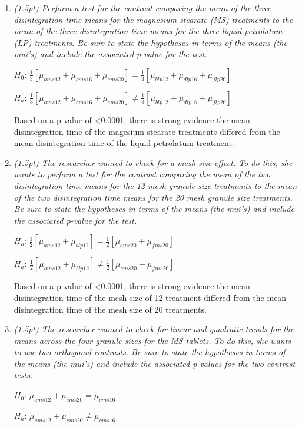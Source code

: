 \documentclass{article}\usepackage[]{graphicx}\usepackage[]{color}
\begin{document}
\begin{enumerate}
\begin{enumerate}
\item
{\it  (1.5pt) Perform a test for the contrast comparing the mean of the three disintegration time
means for the magnesium stearate (MS) treatments to the mean of the three disintegration time
means for the three liquid petrolatum (LP) treatments. Be sure to state the hypotheses in terms
of the means (the mui's) and include the associated p-value for the test.}

$H_{0}$: $\frac{1}{3}[\mu_{ams12} + \mu_{cms16} + \mu_{ems20}] = \frac{1}{3}[\mu_{blp12} + \mu_{dlp16} + \mu_{flp20}]$

$H_{a}$: $\frac{1}{3}[\mu_{ams12} + \mu_{cms16} + \mu_{ems20}] \neq \frac{1}{3}[\mu_{blp12} + \mu_{dlp16} + \mu_{flp20}]$

Based on a p-value of \textless 0.0001, there is strong evidence the mean disintegration time of the magesium stearate treatments differed from the mean disintegration time of the liquid petrolatum treatment.

\item
{\it  (1.5pt) The researcher wanted to check for a mesh size effect. To do this, she wants to perform a test for the contrast comparing the mean of the two disintegration time means for the 12 mesh granule size treatments to the mean of the two disintegration time means for the 20 mesh granule size treatments. Be sure to state the hypotheses in terms of the means (the mui's) and include the associated p-value for the test.}

$H_{o}$: $\frac{1}{2}[\mu_{ams12} + \mu_{blp12}] = \frac{1}{2}[\mu_{ems20} + \mu_{fms20}]$

$H_{a}$: $\frac{1}{2}[\mu_{ams12} + \mu_{blp12}] \neq \frac{1}{2}[\mu_{ems20} + \mu_{fms20}]$

Based on a p-value of \textless 0.0001, there is strong evidence the mean disintegration time of the mesh size of 12 treatment differed from the mean disintegration time of the mesh size of 20 treatments.


\item 
{\it  (1.5pt) The researcher wanted to check for linear and quadratic trends for the means across the four granule sizes for the MS tablets. To do this, she wants to use two orthogonal contrasts. Be sure to state the hypotheses in terms of the means (the mui's) and include the associated p-values for the two contrast tests.}

$H_{0}$: $\mu_{ams12} + \mu_{ems20} = \mu_{cms16}$

$H_{a}$: $\mu_{ams12} + \mu_{ems20} \neq \mu_{cms16}$ 


\end{enumerate}
\end{enumerate}
\end{document}

